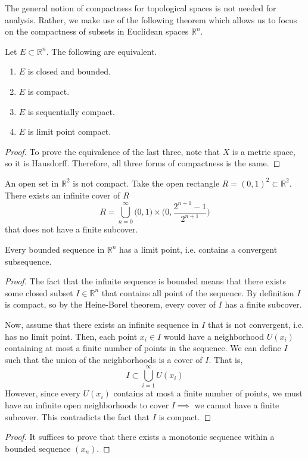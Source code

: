   The general notion of compactness for topological spaces is not needed for analysis. Rather, we make use of the following theorem which allows us to focus on the compactness of subsets in Euclidean spaces $\mathbb{R}^n$. 

  \begin{theorem}
    Let $E \subset \mathbb{R}^n$. The following are equivalent. 
    \begin{enumerate}
      \item $E$ is closed and bounded. 
      \item $E$ is compact. 
      \item $E$ is sequentially compact. 
      \item $E$ is limit point compact. 
    \end{enumerate}
  \end{theorem}
  \begin{proof}
    To prove the equivalence of the last three, note that $X$ is a metric space, so it is Hausdorff. Therefore, all three forms of compactness is the same. 
  \end{proof}

  \begin{example}
    An open set in $\mathbb{R}^2$ is not compact. Take the open rectangle $ R = (0,1)^2 \subset \mathbb{R}^2$. There exists an infinite cover of $R$
    \begin{equation}
      R = \bigcup_{n=0}^\infty \big(0,1\big) \times \bigg( 0, \frac{ 2^{n+1} - 1}{2^{n+1}} \bigg)
    \end{equation}
    that does not have a finite subcover. 
  \end{example}

  \begin{corollary}
    Every bounded sequence in $\mathbb{R}^n$ has a limit point, i.e. contains a convergent subsequence. 
  \end{corollary}
  \begin{proof}
    The fact that the infinite sequence is bounded means that there exists some closed subset $I \in \mathbb{R}^n$ that contains all point of the sequence. By definition $I$ is compact, so by the Heine-Borel theorem, every cover of $I$ has a finite subcover. 

    Now, assume that there exists an infinite sequence in $I$ that is not convergent, i.e. has no limit point. Then, each point $x_i \in I$ would have a neighborhood $U(x_i)$ containing at most a finite number of points in the sequence. We can define $I$ such that the union of the neighborhoods is a cover of $I$. That is, 
    \[I \subset \bigcup_{i=1}^\infty U(x_i)\]
    However, since every $U(x_i)$ contains at most a finite number of points, we must have an infinite open neighborhoods to cover $I \implies$ we cannot have a finite subcover. This contradicts the fact that $I$ is compact. 
  \end{proof}
  \begin{proof}
    It suffices to prove that there exists a monotonic sequence within a bounded sequence $(x_n)$. 
  \end{proof}

